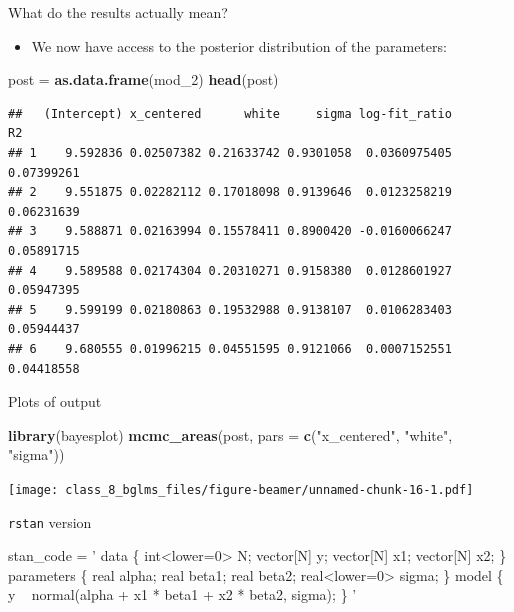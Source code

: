 \documentclass[ignorenonframetext,]{beamer}
\newenvironment{Shaded}{\begin{snugshade}}{\end{snugshade}}
\newcommand{\KeywordTok}[1]{\textcolor[rgb]{0.13,0.29,0.53}{\textbf{#1}}}
\newcommand{\DataTypeTok}[1]{\textcolor[rgb]{0.13,0.29,0.53}{#1}}
\newcommand{\DecValTok}[1]{\textcolor[rgb]{0.00,0.00,0.81}{#1}}
\newcommand{\StringTok}[1]{\textcolor[rgb]{0.31,0.60,0.02}{#1}}
\newcommand{\NormalTok}[1]{#1}
\providecommand{\tightlist}{%
  \setlength{\itemsep}{0pt}\setlength{\parskip}{0pt}}
\begin{document}
\begin{frame}[fragile]{What do the results actually mean?}

\begin{itemize}
\tightlist
\item
  We now have access to the posterior distribution of the parameters:
\end{itemize}

\begin{Shaded}
\begin{Highlighting}[]
\NormalTok{post =}\StringTok{ }\KeywordTok{as.data.frame}\NormalTok{(mod_}\DecValTok{2}\NormalTok{)}
\KeywordTok{head}\NormalTok{(post)}
\end{Highlighting}
\end{Shaded}

\begin{verbatim}
##   (Intercept) x_centered      white     sigma log-fit_ratio         R2
## 1    9.592836 0.02507382 0.21633742 0.9301058  0.0360975405 0.07399261
## 2    9.551875 0.02282112 0.17018098 0.9139646  0.0123258219 0.06231639
## 3    9.588871 0.02163994 0.15578411 0.8900420 -0.0160066247 0.05891715
## 4    9.589588 0.02174304 0.20310271 0.9158380  0.0128601927 0.05947395
## 5    9.599199 0.02180863 0.19532988 0.9138107  0.0106283403 0.05944437
## 6    9.680555 0.01996215 0.04551595 0.9121066  0.0007152551 0.04418558
\end{verbatim}

\end{frame}

\begin{frame}[fragile]{Plots of output}

\begin{Shaded}
\begin{Highlighting}[]
\KeywordTok{library}\NormalTok{(bayesplot)}
\KeywordTok{mcmc_areas}\NormalTok{(post,}
           \DataTypeTok{pars =} \KeywordTok{c}\NormalTok{(}\StringTok{"x_centered"}\NormalTok{, }\StringTok{"white"}\NormalTok{, }\StringTok{"sigma"}\NormalTok{))}
\end{Highlighting}
\end{Shaded}

\texttt{[image: class\_8\_bglms\_files/figure-beamer/unnamed-chunk-16-1.pdf]}

\end{frame}

\begin{frame}[fragile]{\texttt{rstan} version}

\begin{Shaded}
\begin{Highlighting}[]
\NormalTok{stan_code =}\StringTok{ '}
\StringTok{data \{}
\StringTok{  int<lower=0> N;}
\StringTok{  vector[N] y;}
\StringTok{  vector[N] x1;}
\StringTok{  vector[N] x2;}
\StringTok{\}}
\StringTok{parameters \{}
\StringTok{  real alpha;}
\StringTok{  real beta1;}
\StringTok{  real beta2;}
\StringTok{  real<lower=0> sigma;}
\StringTok{\}}
\StringTok{model \{}
\StringTok{  y ~ normal(alpha + x1 * beta1  + x2 * beta2, sigma);}
\StringTok{\}}
\StringTok{'}
\end{Highlighting}
\end{Shaded}

\end{frame}
\end{document}
